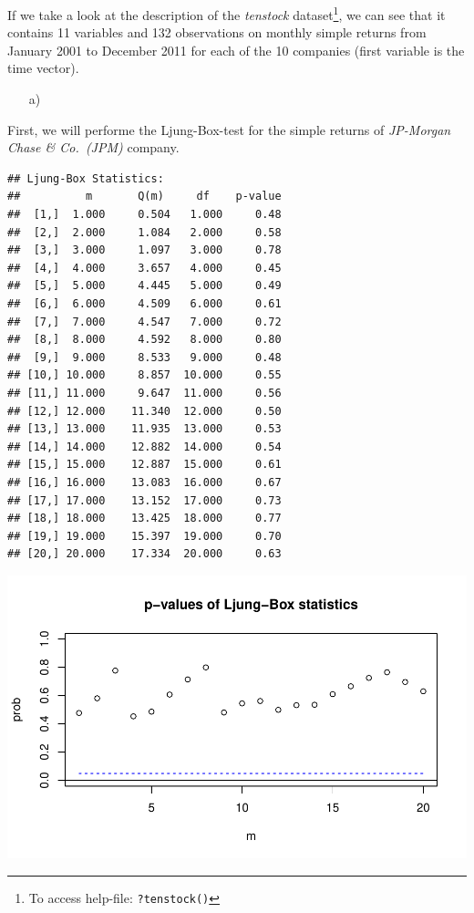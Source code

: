 \documentclass[12pt,a4paper]{article}
\newenvironment{Shaded}{\begin{snugshade}}{\end{snugshade}}
\newcommand{\DataTypeTok}[1]{\textcolor[rgb]{0.13,0.29,0.53}{#1}}
\newcommand{\DecValTok}[1]{\textcolor[rgb]{0.00,0.00,0.81}{#1}}
\newcommand{\KeywordTok}[1]{\textcolor[rgb]{0.13,0.29,0.53}{\textbf{#1}}}
\newcommand{\NormalTok}[1]{#1}
\newcommand{\OperatorTok}[1]{\textcolor[rgb]{0.81,0.36,0.00}{\textbf{#1}}}
\let\rmarkdownfootnote\footnote%
\def\footnote{\protect\rmarkdownfootnote}
\begin{document}
If we take a look at the description of the \emph{tenstock}
dataset\footnote{To access help-file: \texttt{?tenstock()}}, we can see
that it contains 11 variables and 132 observations on monthly simple
returns from January 2001 to December 2011 for each of the 10 companies
(first variable is the time vector).

\begin{itemize}
  \item[a)] $\quad$
\end {itemize}

First, we will performe the Ljung-Box-test for the simple returns of
\emph{JP-Morgan Chase \& Co.~(JPM)} company.

\begin{Shaded}
\end{Shaded}

\begin{verbatim}
## Ljung-Box Statistics:  
##          m       Q(m)     df    p-value
##  [1,]  1.000     0.504   1.000     0.48
##  [2,]  2.000     1.084   2.000     0.58
##  [3,]  3.000     1.097   3.000     0.78
##  [4,]  4.000     3.657   4.000     0.45
##  [5,]  5.000     4.445   5.000     0.49
##  [6,]  6.000     4.509   6.000     0.61
##  [7,]  7.000     4.547   7.000     0.72
##  [8,]  8.000     4.592   8.000     0.80
##  [9,]  9.000     8.533   9.000     0.48
## [10,] 10.000     8.857  10.000     0.55
## [11,] 11.000     9.647  11.000     0.56
## [12,] 12.000    11.340  12.000     0.50
## [13,] 13.000    11.935  13.000     0.53
## [14,] 14.000    12.882  14.000     0.54
## [15,] 15.000    12.887  15.000     0.61
## [16,] 16.000    13.083  16.000     0.67
## [17,] 17.000    13.152  17.000     0.73
## [18,] 18.000    13.425  18.000     0.77
## [19,] 19.000    15.397  19.000     0.70
## [20,] 20.000    17.334  20.000     0.63
\end{verbatim}

\includegraphics{exercise_1_files/figure-latex/unnamed-chunk-3-1.pdf}
\end{document}
